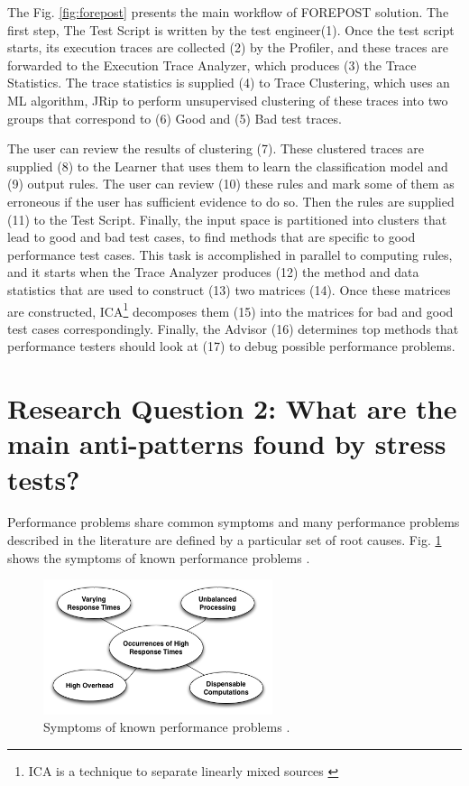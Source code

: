 \documentclass[espaco=umemeio,chapter=TITLE,twoside,openright]{abnt}
\begin{document}
The Fig. \ref{fig:forepost} presents the main workflow of FOREPOST solution. The first step,  The Test Script is written by the test engineer(1). Once the test script starts, its execution traces are collected (2) by the Profiler, and these traces are forwarded to the Execution Trace Analyzer, which produces (3) the Trace Statistics. The trace statistics is supplied (4) to Trace Clustering, which uses an ML algorithm, JRip to perform unsupervised clustering of these traces into two groups that correspond to (6) Good and (5) Bad test traces.

The user can review the results of clustering (7). These clustered traces are supplied (8) to the Learner that uses them to learn the classification model and (9) output rules. The user can review (10) these rules and mark some of them as erroneous if the user has sufficient evidence to do so. Then the rules are supplied (11) to the Test Script. Finally, the input space is partitioned into clusters that lead to good and bad test cases, to find methods that are specific to good performance test cases. This task is accomplished in parallel to computing rules, and it starts when the Trace Analyzer produces (12) the method and data statistics that are used to construct (13) two matrices (14). Once these matrices are constructed, ICA\footnote{ICA is a technique to separate linearly mixed sources \cite{Luo2015}} decomposes them (15) into the matrices for bad and good test cases correspondingly. Finally, the Advisor (16) determines top methods that performance testers should look at (17) to debug possible performance problems.

\section{Research Question 2: What are the main anti-patterns found by stress tests?}

 Performance problems share common symptoms and many performance problems described in the literature are defined by a particular set of root causes. Fig. \ref{fig:symptoms}  shows the symptoms of known performance problems \cite{Wert2013a}.



\begin{figure}[h]
\centering
\includegraphics[width=0.6\textwidth]{./images/Symptoms.png}
\caption{Symptoms of known performance problems \cite{Wert2013a}. }
\label{fig:symptoms}
\end{figure}
\end{document}
